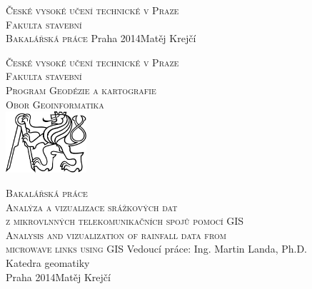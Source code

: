 \begin{center}
\newcommand{\napisCVUT}{České vysoké učení technické v Praze}
\newcommand{\napisFS}{Fakulta stavební}
\newcommand{\napisProgram}{Program Geodézie a kartografie}
\newcommand{\napisObor}{Obor Geoinformatika}
\newcommand{\napisKatedra}{Katedra geomatiky}
\newcommand{\napisVedouci}{Ing. Martin Landa, Ph.D.}
\newcommand{\napisAutor}{Matěj Krejčí}
\newcommand{\napisDatum}{Praha 2014}
\newcommand{\napisNazevI}{Analýza a vizualizace srážkových dat }
\newcommand{\napisNazevII}{z mikrovlnných telekomunikačních spojů pomocí GIS}
\newcommand{\napisNazevAjI}{Analysis and vizualization of rainfall data from}
\newcommand{\napisNazevAjII}{microwave links using GIS}
\newcommand{\napisBakalarka}{Bakalářská práce}
\newcommand{\napisPraha}{Praha 2014}
%
\newcommand{\velka}[1]{\textsc{#1}}
%
% 
\newif\ifpatitul
\patitultrue

\ifpatitul
{\Large\velka{\napisCVUT}}\\
\velka{\Large\napisFS}\\
\vfill
{\LARGE\velka{\napisBakalarka}}
\vfill
{\large\napisPraha\hfill\napisAutor}
\newpage
\fi%


{\Large\velka{\napisCVUT}}\\
{\Large\velka{\napisFS}}\\
{\Large\velka{\napisProgram}}\\
{\Large\velka{\napisObor}}\\
\vfill
\includegraphics[width=3cm]{logo_cvut_cb} %
\vfill

{\Large\velka{\napisBakalarka}}\\
{\Large\velka{\napisNazevI\\
\napisNazevII}}\\
{\large\velka{\napisNazevAjI\\
\napisNazevAjII}}
\vfill
{\large%
Vedoucí práce: \napisVedouci\\
\napisKatedra\\
\bigskip
\napisDatum\hfill\napisAutor}
\end{center}

